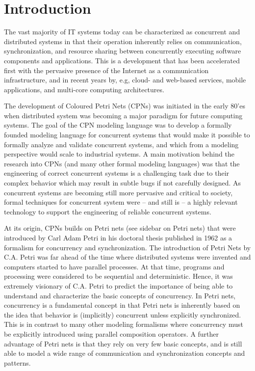 \section{Introduction}

The vast majority of IT systems today can be characterized as
concurrent and distributed systems in that their operation inherently
relies on communication, synchronization, and resource sharing between
concurrently executing software components and applications. This is a
development that has been accelerated first with the pervasive
presence of the Internet as a communication infrastructure, and in
recent years by, e.g, cloud- and web-based services, mobile
applications, and multi-core computing architectures.


The development of Coloured Petri Nets (CPNs) was initiated in the
early 80'es when distributed system was becoming a major paradigm for
future computing systems. The goal of the CPN modeling language was to
develop a formally founded modeling language for concurrent systems
that would make it possible to formally analyze and validate
concurrent systems, and which from a modeling perspective would scale
to industrial systems. A main motivation behind the research into CPNs
(and many other formal modeling languages) was that the engineering of
correct concurrent systems is a challenging task due to their complex
behavior which may result in subtle bugs if not carefully designed. As
concurrent systems are becoming still more pervasive and critical to
society, formal techniques for concurrent system were -- and still is
-- a highly relevant technology to support the engineering of reliable
concurrent systems.


At its origin, CPNs builds on Petri nets (see sidebar on Petri nets)
that were introduced by Carl Adam Petri in his doctoral thesis
published in 1962 \cite{capetri:thesis} as a formalism for concurrency
and synchronization. The introduction of Petri Nets by C.A. Petri was
far ahead of the time where distributed systems were invented and
computers started to have parallel processes. At that time, programs
and processing were considered to be sequential and
deterministic. Hence, it was extremely visionary of C.A. Petri to
predict the importance of being able to understand and characterize
the basic concepts of concurrency. In Petri nets, concurrency is a
fundamental concept in that Petri nets is inherently based on the idea
that behavior is (implicitly) concurrent unless explicitly
synchronized. This is in contrast to many other modeling formalisms
where concurrency must be explicitly introduced using parallel
composition operators. A further advantage of Petri nets is that they
rely on very few basic concepts, and is still able to model a wide
range of communication and synchronization concepts and patterns.\\

